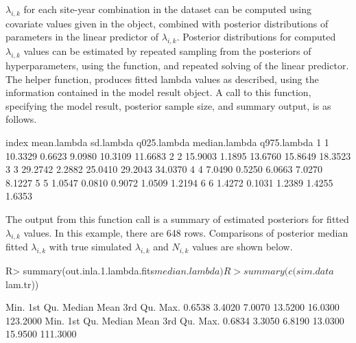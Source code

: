 \documentclass[codesnippet]{jss}
\begin{document}
$\lambda_{i,k}$ for each site-year combination in the dataset can be 
computed using covariate values given in the  
object, combined with posterior distributions of parameters in the linear 
predictor of $\lambda_{i,k}$. Posterior distributions for computed 
$\lambda_{i,k}$ values can be estimated by repeated sampling from the 
posteriors of hyperparameters, using the  
function, and repeated solving of the linear predictor. The helper function, 
 produces fitted lambda values as described, 
using the information contained in the model result object. A call to this 
function, specifying the model result, posterior sample size, and summary 
output, is as follows.

\begin{CodeOutput}
  index mean.lambda sd.lambda  q025.lambda  median.lambda   q975.lambda
1     1     10.3329    0.6623       9.0980        10.3109       11.6683
2     2     15.9003    1.1895      13.6760        15.8649       18.3523
3     3     29.2742    2.2882      25.0410        29.2043       34.0370
4     4      7.0490    0.5250       6.0663         7.0270        8.1227
5     5      1.0547    0.0810       0.9072         1.0509        1.2194
6     6      1.4272    0.1031       1.2389         1.4255        1.6353
\end{CodeOutput}

The output from this function call is a summary of estimated posteriors for 
fitted $\lambda_{i,k}$ values. In this example, there are 648 rows. 
Comparisons of posterior median fitted $\lambda_{i,k}$ with true simulated 
$\lambda_{i,k}$ and $N_{i,k}$ values are shown below.

\begin{CodeInput}
R> summary(out.inla.1.lambda.fits$median.lambda)
R> summary(c(sim.data$lam.tr))
\end{CodeInput}
\begin{CodeOutput}
  Min.   1st Qu.    Median     Mean    3rd Qu.       Max. 
0.6538    3.4020    7.0070  13.5200    16.0300   123.2000
  Min.   1st Qu.    Median     Mean    3rd Qu.       Max. 
0.6834    3.3050    6.8190  13.0300    15.9500   111.3000 
\end{CodeOutput}
\end{document}
